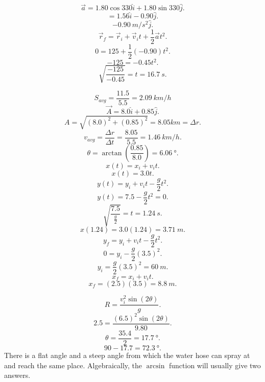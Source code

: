 \documentclass[11pt]{homework}
\begin{document}
\setcounter{questionCounter}{22}
\question
\begin{alphaparts}
    \questionpart
    \[
    \vec{a}=1.80\cos330\hat{i}+1.80\sin330\hat{j}
    .\] \[
    =1.56\hat{i}-0.90\hat{j}
    .\] \[
    \boxed{\qty{-0.90}{m/s^2\hat{j}}}
    .\] 
    \questionpart
    \[
    \vec{r}_{f}=\vec{r}_{i}+\vec{v}_{i}t+\frac{1}{2}\vec{a}t^2
    .\] \[
    0=125+\frac{1}{2}(-0.90)t^2
    .\] \[
    -125=-0.45t^2
    .\] \[
    \sqrt{\frac{-125}{-0.45}}=t=\boxed{\qty{16.7}{s}} 
    .\] 
\end{alphaparts}
\question
\[
    S_{avg} = \frac{11.5}{5.5}=\boxed{\qty{2.09}{km/h}}
\]\[
\vec{A}=8.0\hat{i}+0.85\hat{j}
.\]  \[
A=\sqrt{(8.0)^2+(0.85)^2}=8.05km=\Delta r 
.\] \[
v_{avg}=\frac{\Delta r}{\Delta t}=\frac{8.05}{5.5}=\boxed{\qty{1.46}{km/h}}
.\] \[
\theta =\arctan\left(\frac{0.85}{8.0}\right)=\boxed{\qty{6.06}{\degree}}
.\] 
\setcounter{questionCounter}{31}
\question
\[
x(t)=x_i+v_it
.\] \[
x(t)=3.0t
.\] \[
y(t)=y_i+v_it-\frac{g}{2}t^2
.\] \[
y(t)=7.5 - \frac{g}{2}t^2=0
.\] \[
\sqrt{\frac{7.5}{\frac{g}{2}}}=t=\qty{1.24}{s} 
.\] \[
x(1.24)=3.0(1.24)=\boxed{\qty{3.71}{m}}
.\] 
\question
\[
    y_f=y_i+v_it-\frac{g}{2}t^2
.\] \[
0=y_i-\frac{g}{2}(3.5)^2
.\] \[
y_i=\frac{g}{2}(3.5)^2=\boxed{\qty{60}{m}}
.\] \[
x_f=x_i+v_it
.\] \[
x_f=(2.5)(3.5)=\boxed{\qty{8.8}{m}}
.\] 

\setcounter{questionCounter}{36}
\question
\[
    R=\frac{v_i^2\sin(2\theta)}{g}
.\] \[
2.5=\frac{(6.5)^2\sin(2\theta)}{9.80}
.\] \[
\theta=\frac{35.4}{2}=\boxed{\qty{17.7}{\degree}}
.\] \[
90-17.7=\boxed{\qty{72.3}{\degree}}
.\] 
There is a flat angle and a steep angle from which the water hose can spray at and reach the same place. Algebraically, the $\arcsin$ function will usually give two answers.

\centering
{}
\end{document}
